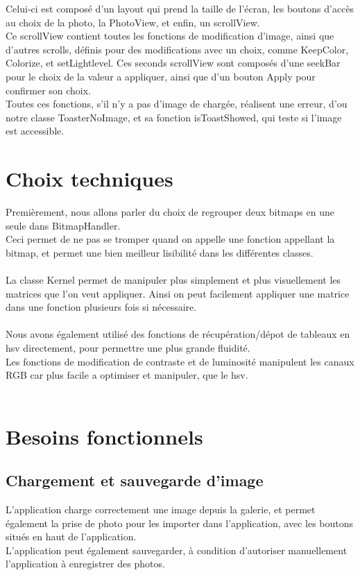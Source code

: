 \documentclass[12pt]{article}
\begin{document}
    Celui-ci est composé d'un layout qui prend la taille de l'écran, les boutons d'accès au choix de la photo, la PhotoView, et enfin, un scrollView.\\
    Ce scrollView contient toutes les fonctions de modification d'image, ainsi que d'autres scrolls, définis pour des modifications avec un choix, comme KeepColor, Colorize, et setLightlevel.
    Ces seconds scrollView sont composés d'une seekBar pour le choix de la valeur a appliquer, ainsi que d'un bouton Apply pour confirmer son choix.\\
    Toutes ces fonctions, s'il n'y a pas d'image de chargée, réalisent une erreur, d'ou notre classe ToasterNoImage, et sa fonction isToastShowed, qui teste si l'image est accessible.\\

    \bigskip

\section{Choix techniques}
    Premièrement, nous allons parler du choix de regrouper deux bitmaps en une seule dans BitmapHandler. \\
    Ceci permet de ne pas se tromper quand on appelle une fonction appellant la bitmap, et permet une bien meilleur lisibilité dans les différentes classes.\\
    \\
    La classe Kernel permet de manipuler plus simplement et plus visuellement les matrices que l'on veut appliquer. Ainsi on peut facilement appliquer une matrice dans une fonction plusieurs fois si nécessaire.
    \\
    \\
    Nous avons également utilisé des fonctions de récupération/dépot de tableaux en hsv directement, pour permettre une plus grande fluidité.
    \\
    Les fonctions de modification de contraste et de luminosité manipulent les canaux RGB car plus facile a optimiser et manipuler, que le hsv.\\
    \\



\section{Besoins fonctionnels}



    \subsection{Chargement et sauvegarde d'image}
    L'application charge correctement une image depuis la galerie, et permet également la prise de photo pour les importer dans l'application,
     avec les boutons situés en haut de l'application.\\
    L'application peut également sauvegarder, à condition d'autoriser manuellement l'application à enregistrer des photos.\\
    \\
\end{document}
